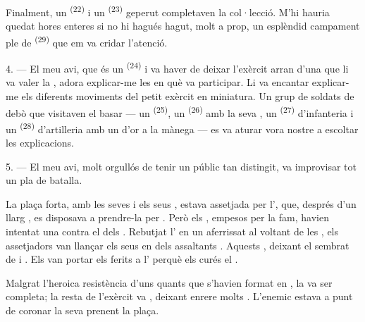 Finalment, un  \textsuperscript{(22)} i un 
\textsuperscript{(23)} geperut completaven la col·lecció. M'hi hauria quedat hores enteres si
no hi hagués hagut, molt a prop, un esplèndid campament ple de
 \textsuperscript{(29)} que em va cridar l'atenció.

\VUsaut{4.0mm}
\VUsaut{2.8mm}

4. --- El meu avi, que és un  \textsuperscript{(24)} i va haver de
deixar l'exèrcit arran d'una  que li va valer la
, adora explicar-me les  en què va
participar. Li va encantar explicar-me els diferents moviments del petit exèrcit en miniatura.
Un grup de soldats de debò que visitaven el basar --- un
 \textsuperscript{(25)}, un 
\textsuperscript{(26)} amb la seva , un 
\textsuperscript{(27)} d'infanteria i un  \textsuperscript{(28)} d'artilleria
amb un  d'or a la mànega --- es va aturar vora nostre a escoltar les
explicacions.

5. --- El meu avi, molt orgullós de tenir un públic tan distingit, va improvisar tot un pla de
batalla.

La plaça forta, amb les seves  i els seus , estava assetjada
per l', que, després d'un llarg
, es disposava a prendre-la per . Però els
, empesos per la fam, havien intentat una 
contra el  dels . Rebutjat l' en un
aferrissat  al voltant de les , els assetjadors
 van llançar els seus  en
 dels assaltants . Aquests , deixant el  sembrat de  i
. Els  van portar els ferits a l' perquè els curés el .

Malgrat l'heroica resistència d'uns quants  que s'havien format en
, la  va ser completa; la resta de l'exèrcit va
, deixant enrere molts . L'enemic estava a punt de
coronar la seva  prenent la plaça.

